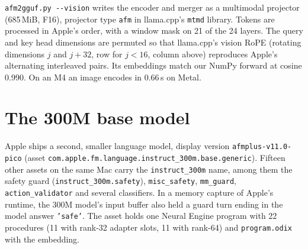 \documentclass[11pt,reqno]{amsart}
\makeatletter
\newcommand{\code}[1]{\texttt{#1}}
\renewcommand\paragraph{\@startsection{paragraph}{4}\z@{.6\linespacing\@plus.2\linespacing}{-\fontdimen2\font}{\normalfont\bfseries}}
\theoremstyle{definition}
\makeatother
\begin{document}
\paragraph{In llama.cpp.} \code{afm2gguf.py -{}-vision} writes the encoder and merger as a multimodal projector (685\,MiB, F16), projector type \code{afm} in llama.cpp's \code{mtmd} library. Tokens are processed in Apple's order, with a window mask on 21 of the 24 layers. The query and key head dimensions are permuted so that llama.cpp's vision RoPE (rotating dimensions $j$ and $j{+}32$, row for $j<16$, column above) reproduces Apple's alternating interleaved pairs. Its embeddings match our NumPy forward at cosine 0.990. On an M4 an image encodes in 0.66\,s on Metal.

\section{The 300M base model}\label{sec:pico}

Apple ships a second, smaller language model, display version \code{afmplus-v11.0-pico} (asset \code{com.apple.fm.language.\allowbreak instruct\_300m.base.generic}). Fifteen other assets on the same Mac carry the \code{instruct\_300m} name, among them the safety guard (\code{instruct\_300m.safety}), \code{misc\_safety}, \code{mm\_guard}, \code{action\_validator} and several classifiers. In a memory capture of Apple's runtime, the 300M model's input buffer also held a guard turn ending in the model answer \code{'safe'}. The asset holds one Neural Engine program with 22 procedures (11 with rank-32 adapter slots, 11 with rank-64) and \code{program.odix} with the embedding.
\end{document}
